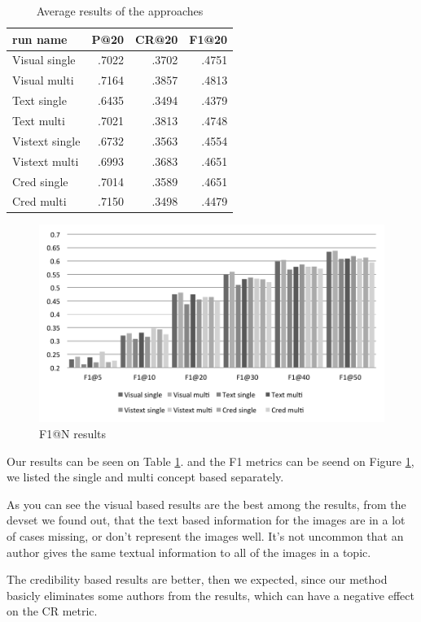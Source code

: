 \documentclass{sig-alternate}
\begin{document}
\begin{table}[h]
	\centering
\begin{tabular}{|l|r|r|r|}
	\hline 
	run name & P@20 & CR@20 & F1@20\tabularnewline
	\hline 
	\hline 
	Visual single & .7022 & .3702 & .4751\tabularnewline
	\hline 
	Visual multi & .7164 & .3857 & .4813\tabularnewline
	\hline 
	Text single & .6435 & .3494 & .4379\tabularnewline
	\hline 
	Text multi & .7021 & .3813 & .4748\tabularnewline
	\hline 
	Vistext single & .6732 & .3563 & .4554\tabularnewline
	\hline 
	Vistext multi & .6993 & .3683 & .4651\tabularnewline
	\hline 
	Cred single & .7014 & .3589 & .4651\tabularnewline
	\hline 
	Cred multi & .7150 & .3498 & .4479\tabularnewline
	\hline 
\end{tabular}
\label{table:results}
\caption{Average results of the approaches}
\end{table}

\begin{figure}[h]
\includegraphics[width=1.0\linewidth]{f1}
\caption{F1@N results}
\label{fig:f1}
\end{figure}

Our results can be seen on Table \ref{table:results}. and the F1 metrics can be seend on Figure \ref{fig:f1}, we listed the single and multi concept based separately. 

As you can see the visual based results are the best among the results, from the devset we found out, that the text based information for the images are in a lot of cases missing, or don't represent the images well. It's not uncommon that an author gives the same textual information to all of the images in a topic.

The credibility based results are better, then we expected, since our method basicly eliminates some authors from the results, which can have a negative effect on the CR metric.



\end{document}
